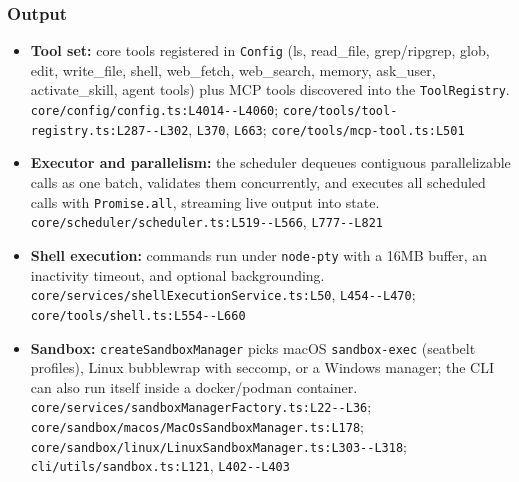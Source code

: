 \subsubsection*{Output}
\begin{itemize}
\item \textbf{Tool set:} core tools registered in \texttt{Config} (ls, read\_file, grep/ripgrep, glob, edit, write\_file, shell, web\_fetch, web\_search, memory, ask\_user, activate\_skill, agent tools) plus MCP tools discovered into the \texttt{ToolRegistry}. \texttt{core/\allowbreak{}config/\allowbreak{}config.\allowbreak{}ts:\allowbreak{}L4014-\allowbreak{}-\allowbreak{}L4060}; \texttt{core/\allowbreak{}tools/\allowbreak{}tool-\allowbreak{}registry.\allowbreak{}ts:\allowbreak{}L287-\allowbreak{}-\allowbreak{}L302}, \texttt{L370}, \texttt{L663}; \texttt{core/\allowbreak{}tools/\allowbreak{}mcp-\allowbreak{}tool.\allowbreak{}ts:\allowbreak{}L501}
\item \textbf{Executor and parallelism:} the scheduler dequeues contiguous parallelizable calls as one batch, validates them concurrently, and executes all scheduled calls with \texttt{Promise.\allowbreak{}all}, streaming live output into state. \texttt{core/\allowbreak{}scheduler/\allowbreak{}scheduler.\allowbreak{}ts:\allowbreak{}L519-\allowbreak{}-\allowbreak{}L566}, \texttt{L777-\allowbreak{}-\allowbreak{}L821}
\item \textbf{Shell execution:} commands run under \texttt{node-\allowbreak{}pty} with a 16MB buffer, an inactivity timeout, and optional backgrounding. \texttt{core/\allowbreak{}services/\allowbreak{}shellExecutionService.\allowbreak{}ts:\allowbreak{}L50}, \texttt{L454-\allowbreak{}-\allowbreak{}L470}; \texttt{core/\allowbreak{}tools/\allowbreak{}shell.\allowbreak{}ts:\allowbreak{}L554-\allowbreak{}-\allowbreak{}L660}
\item \textbf{Sandbox:} \texttt{createSandboxManager} picks macOS \texttt{sandbox-\allowbreak{}exec} (seatbelt profiles), Linux bubblewrap with seccomp, or a Windows manager; the CLI can also run itself inside a docker/podman container. \texttt{core/\allowbreak{}services/\allowbreak{}sandboxManagerFactory.\allowbreak{}ts:\allowbreak{}L22-\allowbreak{}-\allowbreak{}L36}; \texttt{core/\allowbreak{}sandbox/\allowbreak{}macos/\allowbreak{}MacOsSandboxManager.\allowbreak{}ts:\allowbreak{}L178}; \texttt{core/\allowbreak{}sandbox/\allowbreak{}linux/\allowbreak{}LinuxSandboxManager.\allowbreak{}ts:\allowbreak{}L303-\allowbreak{}-\allowbreak{}L318}; \texttt{cli/\allowbreak{}utils/\allowbreak{}sandbox.\allowbreak{}ts:\allowbreak{}L121}, \texttt{L402-\allowbreak{}-\allowbreak{}L403}

\end{itemize}
